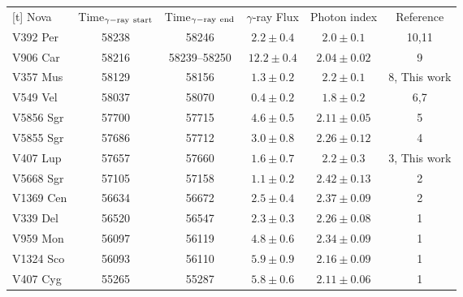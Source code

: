 \begin{table}
\begin{tabular}{lccccc}[t]
Nova & Time$_{\rm \gamma-ray\ start}$ & Time$_{\rm \gamma-ray\ end}$ & $\gamma$-ray Flux & Photon index & Reference\\
V392 Per & 58238\tablenotemark{b} & 58246 & $2.2\pm0.4$ & $2.0\pm0.1$ & 10,11\\
V906 Car & 58216\tablenotemark{a} & 58239--58250\tablenotemark{a} & $12.2\pm0.4$ & $2.04\pm0.02$ & 9 \\
V357 Mus & 58129 & 58156 & $1.3\pm0.2$ & $2.2\pm0.1$ & 8, This work\\
V549 Vel & 58037 & 58070 & $0.4\pm0.2$ & $1.8\pm0.2$ & 6,7 \\
V5856 Sgr & 57700 & 57715 & $4.6\pm0.5$ & $2.11\pm0.05$ & 5 \\
V5855 Sgr & 57686 & 57712 & $3.0\pm0.8$ & $2.26\pm0.12$ & 4 \\
V407 Lup & 57657 & 57660 & $1.6\pm0.7$ & $2.2\pm0.3$ & 3, This work \\
V5668 Sgr & 57105 & 57158 & $1.1\pm0.2$ & $2.42\pm0.13$ & 2 \\ 
V1369 Cen & 56634 & 56672 & $2.5\pm0.4$ & $2.37\pm0.09$ & 2 \\
V339 Del & 56520 & 56547 & $2.3\pm0.3$ & $2.26\pm0.08$ & 1 \\
V959 Mon & 56097 & 56119 & $4.8\pm0.6$ & $2.34\pm0.09$ & 1 \\
V1324 Sco & 56093 & 56110 & $5.9\pm0.9$ & $2.16\pm0.09$ & 1 \\
V407 Cyg & 55265 & 55287 & $5.8\pm0.6$ & $2.11\pm0.06$ & 1 \\
\end{tabular}
\end{table}

